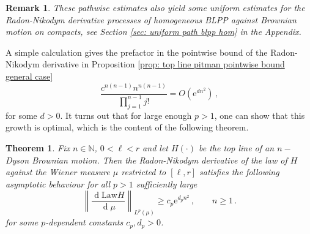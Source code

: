 \documentclass[11pt, reqno]{amsart}
\numberwithin{equation}{section}
\newcounter{dummy} \numberwithin{dummy}{section}
\newtheorem{theorem}[dummy]{Theorem}
\newtheorem*{remark}{Remark}
\newcommand{\N}{\ensuremath{\mathbb{N}}}
\newcommand{\norm}[1]{\left\lVert#1\right\rVert}
\newcommand{\diff}{\ensuremath{\operatorname{d}\!}}
\begin{document}
\begin{remark}
    These pathwise estimates also yield some uniform estimates for the Radon-Nikodym derivative processes of homogeneous BLPP against Brownian motion on compacts, see Section \ref{sec: uniform path blpp hom} in the Appendix.
\end{remark}

A simple calculation gives the prefactor in the pointwise bound of the Radon-Nikodym derivative in Proposition \ref{prop: top line pitman pointwise bound general case}
\[
 \frac{c^{n(n-1)}n^{n(n-1)}}{\prod_{j=1}^{n-1}j!} = O(\mathrm{e}^{dn^2})\,,
\]
for some $d>0$. It turns out that for large enough $p>1$, one can show that this growth is optimal, which is the content of the following theorem.

\begin{theorem}\label{thm: melon lb rn}
Fix $n\in \N$,  $0<\ell<r$ and let $H(\cdot)$ be the top line of an $n-$Dyson Brownian motion. Then the Radon-Nikodym derivative of the law of $H$ against the Wiener measure $\mu$ restricted to $[\ell,r]$ satisfies the following asymptotic behaviour for all $p>1$ sufficiently large 
\begin{equation*}
   \norm{\frac{\diff \mathrm{Law}H}{\diff \mu}}_{L^p(\mu)}\ge c_p \mathrm{e}^{d_p n^2}\,,\qquad n\ge 1\,.
\end{equation*}
for some $p$-dependent constants $c_p, d_p>0$.
\end{theorem}
\end{document}
